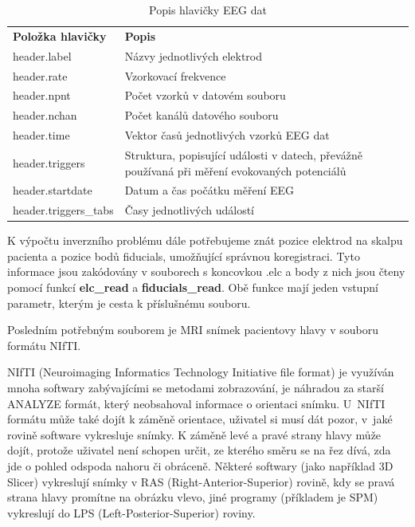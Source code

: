 \begin{table}[!h]
\begin{ctucolortab}
\begin{tabular}{lp{8.5cm}}
\bfseries Položka hlavičky & \bfseries Popis \\
\Midrule
header.label & 	Názvy jednotlivých elektrod \\
header.rate & 	Vzorkovací frekvence \\
header.npnt & 	Počet vzorků v datovém souboru \\
header.nchan & 	Počet kanálů datového souboru \\
header.time & 	Vektor časů jednotlivých vzorků EEG dat \\
header.triggers & 	Struktura, popisující události v datech, převážně používaná při měření evokovaných potenciálů \\
header.startdate & 	Datum a čas počátku měření EEG \\
header.triggers\_tabs & 	Časy jednotlivých událostí
\end{tabular}
\end{ctucolortab}
\caption{Popis hlavičky EEG dat}
\label{hlavickaEEG}
\end{table}

K výpočtu inverzního problému dále potřebujeme znát pozice elektrod na skalpu pacienta a pozice bodů fiducials, umožňující správnou koregistraci. Tyto informace jsou zakódovány v souborech s koncovkou .elc a body z nich jsou čteny pomocí funkcí \textbf{elc\_read} a \textbf{fiducials\_read}. Obě funkce mají jeden vstupní parametr, kterým je cesta k příslušnému souboru.

Posledním potřebným souborem je MRI snímek pacientovy hlavy v souboru formátu NIfTI. 

NIfTI (Neuroimaging Informatics Technology Initiative file format) je využíván mnoha softwary zabývajícími se metodami zobrazování, je náhradou za starší ANALYZE formát, který neobsahoval informace o orientaci snímku.
U~NIfTI formátu může také dojít k záměně orientace, uživatel si musí dát pozor, v~jaké rovině software vykresluje snímky.
K záměně levé a pravé strany hlavy může dojít, protože uživatel není schopen určit, ze kterého směru se na řez dívá, zda jde o pohled odspoda nahoru či obráceně. Některé softwary (jako například 3D Slicer) vykreslují snímky v RAS (Right-Anterior-Superior) rovině, kdy se pravá strana hlavy promítne na obrázku vlevo, jiné programy (příkladem je SPM) vykreslují do LPS (Left-Posterior-Superior) roviny.

